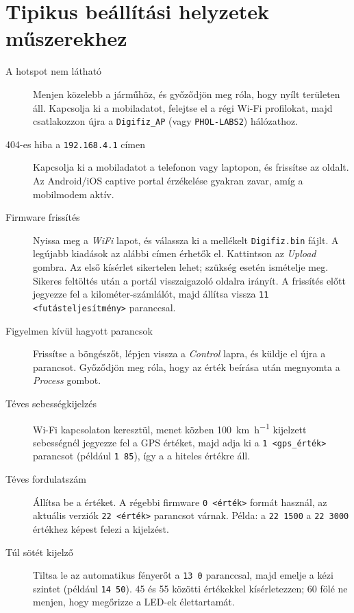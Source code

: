 \chapter{Tipikus beállítási helyzetek \ReplicaNextShort{} műszerekhez}\label{ch:replica-next-scenarios}

\begin{description}
    \item[A hotspot nem látható] Menjen közelebb a járműhöz, és győződjön meg róla, hogy nyílt területen áll. Kapcsolja ki a mobiladatot, felejtse el a régi Wi-Fi profilokat, majd csatlakozzon újra a \texttt{Digifiz\_AP} (vagy \texttt{PHOL-LABS2}) hálózathoz.
    \item[404-es hiba a \texttt{192.168.4.1} címen] Kapcsolja ki a mobiladatot a telefonon vagy laptopon, és frissítse az oldalt. Az Android/iOS captive portal érzékelése gyakran zavar, amíg a mobilmodem aktív.
    \item[Firmware frissítés] Nyissa meg a \emph{WiFi} lapot, és válassza ki a mellékelt \texttt{Digifiz.bin} fájlt. A legújabb kiadások az alábbi címen érhetők el.
        Kattintson az \emph{Upload} gombra. Az első kísérlet sikertelen lehet; szükség esetén ismételje meg. Sikeres feltöltés után a portál visszaigazoló oldalra irányít. A frissítés előtt jegyezze fel a kilométer-számlálót, majd állítsa vissza \verb|11 <futásteljesítmény>| paranccsal.
    \item[Figyelmen kívül hagyott parancsok] Frissítse a böngészőt, lépjen vissza a \emph{Control} lapra, és küldje el újra a parancsot. Győződjön meg róla, hogy az érték beírása után megnyomta a \emph{Process} gombot.
    \item[Téves sebességkijelzés] Wi-Fi kapcsolaton keresztül, menet közben \SI{100}{\kilo\metre\per\hour} kijelzett sebességnél jegyezze fel a GPS értéket, majd adja ki a \verb|1 <gps_érték>| parancsot (például \verb|1 85|), így a  a hiteles értékre áll.
    \item[Téves fordulatszám] Állítsa be a  értéket. A régebbi firmware \verb|0 <érték>| formát használ, az aktuális verziók \verb|22 <érték>| parancsot várnak. Példa: a \verb|22 1500| a \verb|22 3000| értékhez képest felezi a kijelzést.
    \item[Túl sötét kijelző] Tiltsa le az automatikus fényerőt a \verb|13 0| paranccsal, majd emelje a kézi szintet (például \verb|14 50|). 45 és 55 közötti értékekkel kísérletezzen; 60 fölé ne menjen, hogy megőrizze a LED-ek élettartamát.

\end{description}
